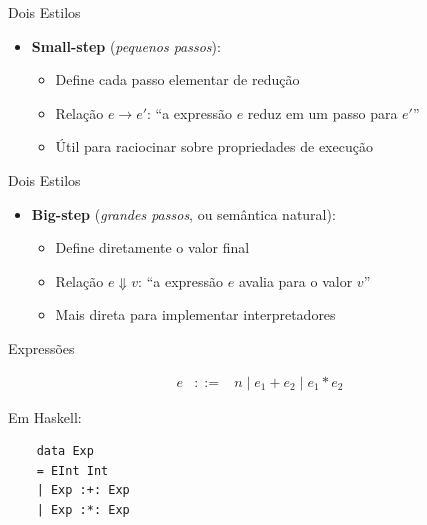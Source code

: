 \begin{frame}{Dois Estilos}

    \begin{itemize}

        \item
        \textbf{Small-step} (\emph{pequenos passos}):

        \begin{itemize}

            \item
            Define cada passo elementar de redução
            \item
            Relação \(e \to e'\): ``a expressão \(e\) reduz em um passo para
            \(e'\)''
            \item
            Útil para raciocinar sobre propriedades de execução
        \end{itemize}
    \end{itemize}
\end{frame}

\begin{frame}{Dois Estilos}

    \begin{itemize}

        \item
        \textbf{Big-step} (\emph{grandes passos}, ou semântica natural):

        \begin{itemize}

            \item
            Define diretamente o valor final
            \item
            Relação \(e \Downarrow v\): ``a expressão \(e\) avalia para o valor
            \(v\)''
            \item
            Mais direta para implementar interpretadores
        \end{itemize}
    \end{itemize}
\end{frame}

\begin{frame}[fragile]{Expressões}

    \[\begin{array}{lcl}
    e &::=& n \mid e_1 + e_2 \mid e_1 * e_2
\end{array}\]

Em Haskell:

\begin{lstlisting}
    data Exp
    = EInt Int
    | Exp :+: Exp
    | Exp :*: Exp
\end{lstlisting}
\end{frame}



